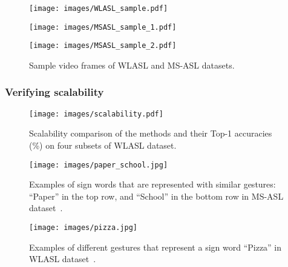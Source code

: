 \documentclass[journal]{IEEEtran}
\begin{document}
\begin{figure}[t]
  \centering

      \begin{minipage}[b]{0.49\hsize}
        \centering
          \texttt{[image: images/WLASL\_sample.pdf]}
          \label{fig:sample_WLASL}
      \end{minipage}

      \begin{minipage}[b]{0.49\hsize}
        \centering
          \texttt{[image: images/MSASL\_sample\_1.pdf]}
          \label{fig:sample_MS-ASL_side}
      \end{minipage}
\hfill
\begin{minipage}[b]{0.49\hsize}
      \centering
        \texttt{[image: images/MSASL\_sample\_2.pdf]}
          \label{fig:sample_MS-ASL_upperbody}
      \end{minipage}
      
    \caption{Sample video frames of WLASL and MS-ASL datasets.}
    \label{fig:sample}
\end{figure}



\subsubsection{Verifying scalability}
\begin{figure}[t]
    \centering
    \texttt{[image: images/scalability.pdf]}
    \caption{Scalability comparison of the methods and their Top-1 accuracies (\%) on four subsets of WLASL dataset. }
    \label{fig:scalability}
\end{figure}

\begin{figure}[t]
  \centering
    \texttt{[image: images/paper\_school.jpg]}
  \caption{Examples of sign words that are represented with similar gestures:
  ``Paper'' in the top row, and ``School'' in the bottom row in MS-ASL dataset~\cite{vaezi2019ms-asl}.}
  \label{fig:ambiguty}
\end{figure}

\begin{figure}[t]
  \centering
    \texttt{[image: images/pizza.jpg]}
  \caption{Examples of different gestures that represent a sign word ``Pizza'' in WLASL dataset~\cite{li2020word}.
}
  \label{fig:diversity}
\end{figure}
\end{document}
